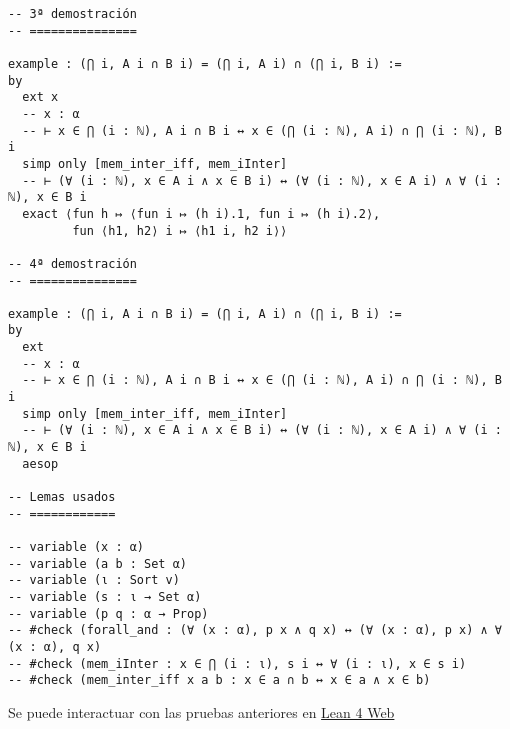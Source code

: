 \begin{verbatim}
-- 3ª demostración
-- ===============

example : (⋂ i, A i ∩ B i) = (⋂ i, A i) ∩ (⋂ i, B i) :=
by
  ext x
  -- x : α
  -- ⊢ x ∈ ⋂ (i : ℕ), A i ∩ B i ↔ x ∈ (⋂ (i : ℕ), A i) ∩ ⋂ (i : ℕ), B i
  simp only [mem_inter_iff, mem_iInter]
  -- ⊢ (∀ (i : ℕ), x ∈ A i ∧ x ∈ B i) ↔ (∀ (i : ℕ), x ∈ A i) ∧ ∀ (i : ℕ), x ∈ B i
  exact ⟨fun h ↦ ⟨fun i ↦ (h i).1, fun i ↦ (h i).2⟩,
         fun ⟨h1, h2⟩ i ↦ ⟨h1 i, h2 i⟩⟩

-- 4ª demostración
-- ===============

example : (⋂ i, A i ∩ B i) = (⋂ i, A i) ∩ (⋂ i, B i) :=
by
  ext
  -- x : α
  -- ⊢ x ∈ ⋂ (i : ℕ), A i ∩ B i ↔ x ∈ (⋂ (i : ℕ), A i) ∩ ⋂ (i : ℕ), B i
  simp only [mem_inter_iff, mem_iInter]
  -- ⊢ (∀ (i : ℕ), x ∈ A i ∧ x ∈ B i) ↔ (∀ (i : ℕ), x ∈ A i) ∧ ∀ (i : ℕ), x ∈ B i
  aesop

-- Lemas usados
-- ============

-- variable (x : α)
-- variable (a b : Set α)
-- variable (ι : Sort v)
-- variable (s : ι → Set α)
-- variable (p q : α → Prop)
-- #check (forall_and : (∀ (x : α), p x ∧ q x) ↔ (∀ (x : α), p x) ∧ ∀ (x : α), q x)
-- #check (mem_iInter : x ∈ ⋂ (i : ι), s i ↔ ∀ (i : ι), x ∈ s i)
-- #check (mem_inter_iff x a b : x ∈ a ∩ b ↔ x ∈ a ∧ x ∈ b)
\end{verbatim}
Se puede interactuar con las pruebas anteriores en \href{https://lean.math.hhu.de/\#url=https://raw.githubusercontent.com/jaalonso/Calculemus2/main/src/Interseccion\_de\_intersecciones.lean}{Lean 4 Web}

